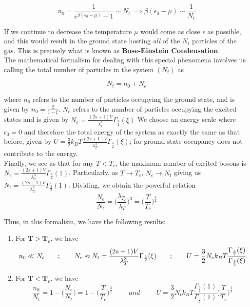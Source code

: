 \documentclass[oneside]{book}
\begin{document}
\[ n_0 =    \frac{1}{e^{\beta(\epsilon_0 - \mu)}-1} \sim N_t \implies \beta(\epsilon_0 - \mu) \sim \frac{1}{N_t} \]

If we continue to decrease the temperature $\mu$ would come as close $\epsilon$ as possible, and this would result in the ground state hosting \emph{all} of the $N_t$ particles of the gas. This is precisely what is known as \textbf{Bose-Einstein Condensation}.\\

The mathematical formalism for dealing with this special phenomena involves us calling the total number of particles in the system $(N_t)$ as 

\[ N_t = n_0 + N_e \]

 where $n_0$ refers to the number of particles occupying the ground state, and is given by $n_0 = \frac{\xi}{1-\xi}$. $N_e$ refers to the number of particles occupying the excited states and is given by $N_e = \frac{(2s+1)V}{\lambda_T^3}\Gamma_{\frac{3}{2}}(\xi)$
We choose an energy scale where $\epsilon_0 = 0$ and therefore the total energy of the system as exactly the same as that before, given by $U = \frac{3}{2}k_BT \frac{(2s+1)V}{\lambda_T^3}\Gamma_{\frac{5}{2}}(\xi)$; for ground state occupancy does not contribute to the energy.\\

Finally, we see as that for any $T<T_c$, the maximum number of excited bosons is
 $ N_e =  \frac{(2s+1)V}{\lambda_{T} ^3}\Gamma_{\frac{3}{2}}(1)$.
Particularly, as $T \rightarrow T_c$, $N_e \rightarrow N_t$ giving us 
$ N_t =  \frac{(2s+1)V}{\lambda_{T_c} ^3}\Gamma_{\frac{3}{2}}(1)$.
Dividing, we obtain the powerful relation 
\[ \frac{N_e}{N_t} =\Bigg(\frac{\lambda_{T_c}}{\lambda_{T}}\Bigg)^{3} =\Bigg(\frac{T}{T_c}\Bigg)^\frac{3}{2} \]

Thus, in this formalism, we have the following results:
\begin{enumerate}
\item For $\bm{T>T_c}$, we have 
\[n_0 \ll N_t 
\hspace{0.7cm};\hspace{0.7cm}
N_e \approx N_t = \frac{(2s+1)V}{\lambda_T^3}\Gamma_{\frac{3}{2}}(\xi) 
\hspace{0.7cm};\hspace{0.7cm}
U = \frac{3}{2}N_ek_BT\frac{\Gamma_{\frac{5}{2}}(\xi)}{\Gamma_{\frac{3}{2}}(\xi) }
\]

\item For $\bm{T<T_c}$, we have 
\[ \frac{n_0}{N_t} = 1 - \Big(\frac{N_e}{N_t}\Big) = 1 - \Bigg(\frac{T}{T_c}\Bigg)^\frac{3}{2} 
\hspace{1cm}and\hspace{1cm}
  U = \frac{3}{2}N_tk_BT\frac{\Gamma_{\frac{5}{2}}(1)}{\Gamma_{\frac{3}{2}}(1) } \Bigg(\frac{T}{T_c}\Bigg)^\frac{3}{2}  \]

\end{enumerate}
\end{document}
